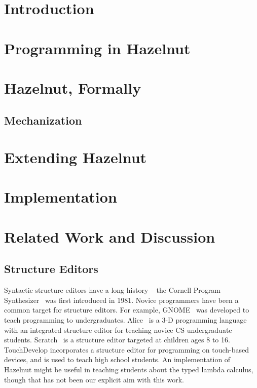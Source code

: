 \documentclass[preprint,9pt]{sigplanconf}
\begin{document}

\section{Introduction}\label{sec:introduction}


\section{Programming in Hazelnut}\label{sec:example}


\section{Hazelnut, Formally}
\label{sec:hazel}


\subsection{Mechanization}
\label{sec:mech}\label{sec:mt}


\section{Extending Hazelnut}\label{sec:extending}


\section{Implementation}
\label{sec:impl}


\section{Related Work and Discussion}\label{sec:rw}
\subsection{Structure Editors}
Syntactic structure editors have a long history -- the Cornell Program
Synthesizer~\cite{teitelbaum_cornell_1981} was first introduced in
1981. Novice programmers have been a common target for structure
editors. For example, GNOME~\cite{garlan_gnome:_1984} was developed to
teach programming to undergraduates.
Alice~\cite{Conway:2000:ALL:332040.332481} is a 3-D programming language
with an integrated structure editor for teaching novice CS undergraduate
students. Scratch~\cite{Resnick:2009:SP:1592761.1592779} is a structure
editor targeted at children ages 8 to 16.
TouchDevelop \cite{tillmann_touchdevelop:_2011} incorporates a structure
editor for programming on touch-based devices, and is used to teach high
school students. An implementation of Hazelnut might be useful in teaching
students about the typed lambda calculus, though that has not been our
explicit aim with this work.
\end{document}
